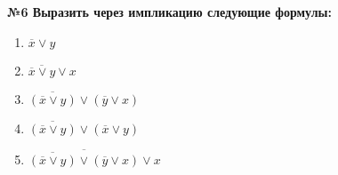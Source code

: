     \begin{center}
        \textbf{№6 Выразить через импликацию следующие формулы:}
    \end{center}

    \begin{minipage}[t]{0.9\textwidth}
        \begin{enumerate}
            \item $\overline x \vee y$
            \item $\overline{\overline x \vee y} \vee x$
            \item $\overline{(\overline x \vee y)} \vee (\overline y \vee x)$
            \item $\overline{(\overline x \vee y)} \vee (\overline x \vee y)$
            \item $\overline{\overline{(\overline x \vee y)} \vee (\overline y \vee x)} \vee x$
        \end{enumerate}
    \end{minipage}

